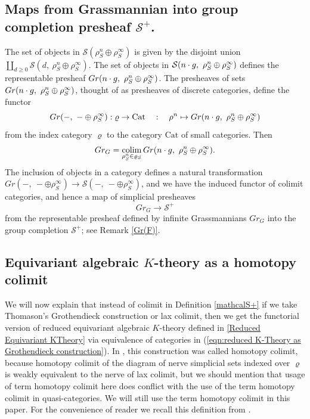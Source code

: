\documentclass[11pt,twoside]{amsart}
\theoremstyle{definition}
\theoremstyle{remark}
\numberwithin{equation}{section}
\newcommand{\mc}{\mathcal}
\DeclareMathOperator*{\colim}{colim}
\begin{document}
\subsection{Maps from Grassmannian into group completion presheaf \texorpdfstring{$\mc{S}^+$}{S+}.} 
The set of objects in $\mc{S}(\rho^n_S\oplus \rho^{\infty}_S)$ is given by the disjoint union $\coprod_{d\geq 0}\mc{S}(d,\ \rho^n_S\oplus \rho^{\infty}_S)$. The set of objects in $\mc{S}(n\cdot 
\textsl{g},\ \rho^n_S\oplus \rho^{\infty}_S)$ defines the representable presheaf $Gr(n\cdot \textsl{g}, \ \rho^n_S\oplus \rho^{\infty}_S)$. 
The presheaves of sets $Gr(n\cdot \textsl{g}, \ \rho^n_S\oplus \rho^{\infty}_S)$, thought of as presheaves of discrete categories, define the functor 
\begin{equation}
\label{Gr_G functor for colim and hocolim}
Gr(-, \ -\oplus \rho^{\infty}_S):\varrho\rightarrow \mathrm{Cat}\ \ \ :\ \ \  \rho^n\mapsto Gr(n\cdot \textsl{g}, \ \rho^n_S\oplus \rho^{\infty}_S)
\end{equation}
from the index category $\varrho$ to the category $\mathrm{Cat}$ of small categories. Then
$$Gr_G = \colim_{\rho^n_S\in  \varrho_S} Gr(n\cdot \textsl{g},\ \rho^n_S\oplus \rho^{\infty}_S).$$
The inclusion of objects in a category defines a natural transformation $Gr(-, \ -\oplus \rho^{\infty}_S)\rightarrow 
\mc{S}(-, \ - \oplus \rho^{\infty}_S)$, and we have the induced functor of colimit
categories, and hence a map of simplicial presheaves 
\begin{equation}
\label{mathcalGr2mathcalS+}
Gr_G \to  \mc{S}^+
\end{equation}
from the representable presheaf defined by infinite Grassmannians $Gr_G$ into the group completion
$ \mc{S}^+$; see Remark \ref{Gr(F)}.

\subsection{Equivariant algebraic \texorpdfstring{$K$}{K}-theory as a homotopy colimit}
\label{rem:SSasHocolim}
We will now explain that instead of colimit in Definition \ref{mathcalS+} if we take Thomason's Grothendieck construction or lax colimit, then we get the functorial version of reduced equivariant algebraic $K$-theory defined in \ref{Reduced Equivariant KTheory} via equivalence of categories in (\ref{eqn:reduced K-Theory as Grothendieck construction}). In \cite[Definition 7]{ST15}, this construction was called homotopy colimit, because homotopy colimit of the diagram of nerve simplicial sets indexed over $\varrho$ is weakly equivalent to the nerve of lax colimit, but we should mention that usage of term homotopy colimit here does conflict with the use of the term homotopy colimit in quasi-categories. We will still use the term homotopy colimit in this paper.
For the convenience of reader we recall this definition from \cite[Definition 7]{ST15}.
\end{document}
